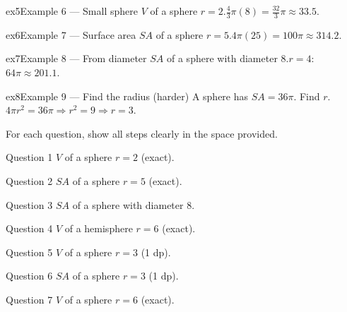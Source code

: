 \documentclass[11pt]{article}
\begin{document}
\begin{example}{ex5}{Example 6 --- Small sphere}
$V$ of a sphere $r=2$.\soln $\tfrac43\pi(8)=\tfrac{32}{3}\pi\approx33.5$.
\end{example}

\begin{example}{ex6}{Example 7 --- Surface area}
$SA$ of a sphere $r=5$.\soln $4\pi(25)=100\pi\approx314.2$.
\end{example}

\begin{example}{ex7}{Example 8 --- From diameter}
$SA$ of a sphere with diameter $8$.\soln $r=4$: $64\pi\approx201.1$.
\end{example}

\begin{example}{ex8}{Example 9 --- Find the radius (harder)}
A sphere has $SA=36\pi$. Find $r$.\soln $4\pi r^2=36\pi\Rightarrow r^2=9\Rightarrow r=3$.
\end{example}

\clearpage
{}
For each question, show all steps clearly in the space provided.

\begin{qbox}{Question 1}
$V$ of a sphere $r=2$ (exact).\workspace{2.0cm}
\end{qbox}

\begin{qbox}{Question 2}
$SA$ of a sphere $r=5$ (exact).\workspace{1.8cm}
\end{qbox}

\begin{qbox}{Question 3}
$SA$ of a sphere with diameter $8$.\workspace{2.0cm}
\end{qbox}

\begin{qbox}{Question 4}
$V$ of a hemisphere $r=6$ (exact).\workspace{2.0cm}
\end{qbox}

\begin{qbox}{Question 5}
$V$ of a sphere $r=3$ (1 dp).\workspace{2.0cm}
\end{qbox}

\begin{qbox}{Question 6}
$SA$ of a sphere $r=3$ (1 dp).\workspace{2.0cm}
\end{qbox}

\begin{qbox}{Question 7}
$V$ of a sphere $r=6$ (exact).\workspace{2.0cm}
\end{qbox}
\end{document}
